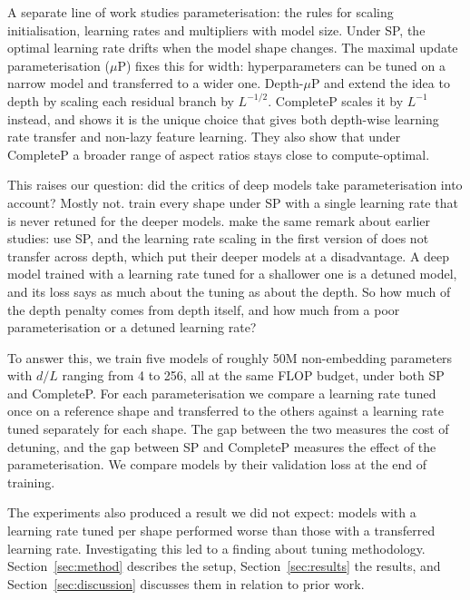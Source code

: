 \documentclass[10pt,twocolumn,a4paper]{article}
\begin{document}
A separate line of work studies parameterisation: the rules for scaling initialisation, learning rates and multipliers with model size. Under SP, the optimal learning rate drifts when the model shape changes. The maximal update parameterisation ($\mu$P) \citep{yang2021feature,yang2022tensor} fixes this for width: hyperparameters can be tuned on a narrow model and transferred to a wider one. Depth-$\mu$P \citep{yang2024depth} and \citet{bordelon2024depthwise} extend the idea to depth by scaling each residual branch by $L^{-1/2}$. CompleteP \citep{dey2025completep} scales it by $L^{-1}$ instead, and shows it is the unique choice that gives both depth-wise learning rate transfer and non-lazy feature learning. They also show that under CompleteP a broader range of aspect ratios stays close to compute-optimal.

This raises our question: did the critics of deep models take parameterisation into account? Mostly not. \citet{fahim2026depth} train every shape under SP with a single learning rate that is never retuned for the deeper models. \citet{dey2025completep} make the same remark about earlier studies: \citet{kaplan2020scaling} use SP, and the learning rate scaling in the first version of \citet{mcleish2025gemstones_v1} does not transfer across depth, which put their deeper models at a disadvantage. A deep model trained with a learning rate tuned for a shallower one is a detuned model, and its loss says as much about the tuning as about the depth. So how much of the depth penalty comes from depth itself, and how much from a poor parameterisation or a detuned learning rate?

To answer this, we train five models of roughly 50M non-embedding parameters with $d/L$ ranging from 4 to 256, all at the same FLOP budget, under both SP and CompleteP. For each parameterisation we compare a learning rate tuned once on a reference shape and transferred to the others against a learning rate tuned separately for each shape. The gap between the two measures the cost of detuning, and the gap between SP and CompleteP measures the effect of the parameterisation. We compare models by their validation loss at the end of training.

The experiments also produced a result we did not expect: models with a learning rate tuned per shape performed worse than those with a transferred learning rate. Investigating this led to a finding about tuning methodology. Section~\ref{sec:method} describes the setup, Section~\ref{sec:results} the results, and Section~\ref{sec:discussion} discusses them in relation to prior work.
\end{document}
